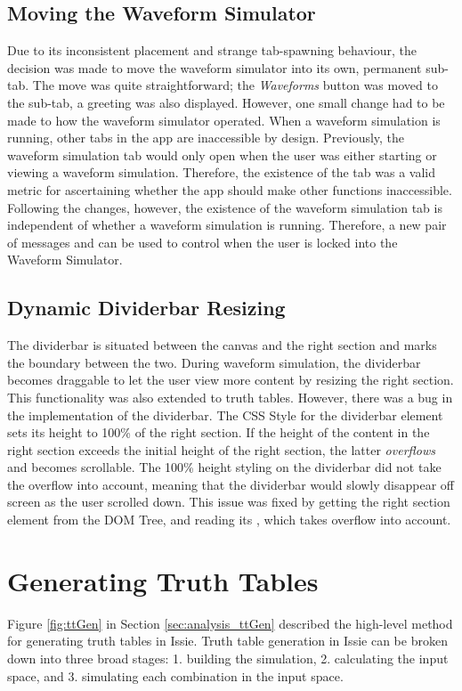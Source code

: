 \subsection{Moving the Waveform Simulator}
Due to its inconsistent placement and strange tab-spawning behaviour, the decision was made to move the waveform simulator into its own, permanent sub-tab. The move was quite straightforward; the \textit{Waveforms} button was moved to the sub-tab, a greeting was also displayed. However, one small change had to be made to how the waveform simulator operated. When a waveform simulation is running, other tabs in the app are inaccessible by design. Previously, the waveform simulation tab would only open when the user was either starting or viewing a waveform simulation. Therefore, the existence of the tab was a valid metric for ascertaining whether the app should make other functions inaccessible. Following the changes, however, the existence of the waveform simulation tab is independent of whether a waveform simulation is running. Therefore, a new pair of messages  and  can be used to control when the user is locked into the Waveform Simulator.

\subsection{Dynamic Dividerbar Resizing}
The dividerbar is situated between the canvas and the right section and marks the boundary between the two. During waveform simulation, the dividerbar becomes draggable to let the user view more content by resizing the right section. This functionality was also extended to truth tables. However, there was a bug in the implementation of the dividerbar. The CSS Style for the dividerbar element sets its height to 100\% of the right section. If the height of the content in the right section exceeds the initial height of the right section, the latter \textit{overflows} and becomes scrollable. The 100\% height styling on the dividerbar did not take the overflow into account, meaning that the dividerbar would slowly disappear off screen as the user scrolled down. This issue was fixed by getting the right section  element from the DOM Tree, and reading its , which takes overflow into account. 

\section{Generating Truth Tables}
Figure \ref{fig:ttGen} in Section \ref{sec:analysis_ttGen} described the high-level method for generating truth tables in Issie. Truth table generation in Issie can be broken down into three broad stages: 1. building the simulation, 2. calculating the input space, and 3. simulating each combination in the input space. 

